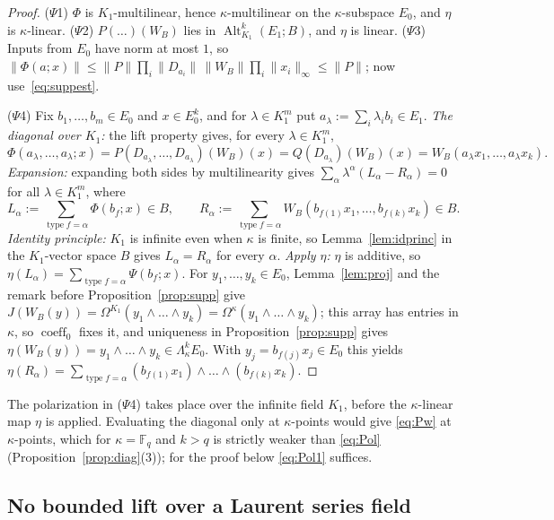 \documentclass[11pt]{amsart}
\theoremstyle{definition}
\theoremstyle{remark}
\numberwithin{equation}{section}
\newcommand{\F}{\mathbb{F}}
\newcommand{\Alt}{\operatorname{Alt}}
\newcommand{\coeff}{\operatorname{coeff}}
\newcommand{\type}{\operatorname{type}}
\newcommand{\norm}[1]{\lVert #1\rVert}
\begin{document}
\begin{proof}
($\Psi$1) $\Phi$ is $K_1$\nobreakdash-multilinear, hence $\kappa$\nobreakdash-multilinear on the $\kappa$\nobreakdash-subspace $E_0$, and $\eta$ is
$\kappa$\nobreakdash-linear. ($\Psi$2) $P(\dots)(W_B)$ lies in $\Alt^k_{K_1}(E_1;B)$, and $\eta$ is linear. ($\Psi$3) Inputs from
$E_0$ have norm at most $1$, so
$\norm{\Phi(a;x)}\le\norm P\prod_i\norm{D_{a_i}}\,\norm{W_B}\prod_i\norm{x_i}_\infty\le\norm P$; now
use~\eqref{eq:suppest}.

($\Psi$4) Fix $b_1,\dots,b_m\in E_0$ and $x\in E_0^k$, and for $\lambda\in K_1^m$ put $a_\lambda:=\sum_i\lambda_ib_i\in
E_1$. \emph{The diagonal over $K_1$:} the lift property gives, for every $\lambda\in K_1^m$,
\[
\Phi(a_\lambda,\dots,a_\lambda;x)=P(D_{a_\lambda},\dots,D_{a_\lambda})(W_B)(x)=Q(D_{a_\lambda})(W_B)(x)
=W_B(a_\lambda x_1,\dots,a_\lambda x_k).
\]
\emph{Expansion:} expanding both sides by multilinearity gives $\sum_\alpha\lambda^\alpha(L_\alpha-R_\alpha)=0$ for all
$\lambda\in K_1^m$, where
\[
L_\alpha:=\sum_{\type f=\alpha}\Phi(b_f;x)\in B,\qquad R_\alpha:=\sum_{\type f=\alpha}W_B(b_{f(1)}x_1,\dots,b_{f(k)}x_k)\in B .
\]
\emph{Identity principle:} $K_1$ is infinite even when $\kappa$ is finite, so Lemma~\ref{lem:idprinc} in the
$K_1$\nobreakdash-vector space $B$ gives $L_\alpha=R_\alpha$ for every $\alpha$. \emph{Apply $\eta$:} $\eta$ is additive, so
$\eta(L_\alpha)=\sum_{\type f=\alpha}\Psi(b_f;x)$. For $y_1,\dots,y_k\in E_0$, Lemma~\ref{lem:proj} and the remark before
Proposition~\ref{prop:supp} give $J(W_B(y))=\Omega^{K_1}(y_1\wedge\dots\wedge y_k)=\Omega^\kappa(y_1\wedge\dots\wedge y_k)$; this array has
entries in $\kappa$, so $\coeff_0$ fixes it, and uniqueness in Proposition~\ref{prop:supp} gives
$\eta(W_B(y))=y_1\wedge\dots\wedge y_k\in\Lambda^k_\kappa E_0$. With $y_j=b_{f(j)}x_j\in E_0$ this yields
$\eta(R_\alpha)=\sum_{\type f=\alpha}(b_{f(1)}x_1)\wedge\dots\wedge(b_{f(k)}x_k)$.
\end{proof}

The polarization in ($\Psi$4) takes place over the infinite field $K_1$, before the $\kappa$\nobreakdash-linear map $\eta$ is
applied. Evaluating the diagonal only at $\kappa$\nobreakdash-points would give \eqref{eq:Pw} at $\kappa$\nobreakdash-points, which for $\kappa=\F_q$ and
$k>q$ is strictly weaker than \eqref{eq:Pol} (Proposition~\ref{prop:diag}(3)); for the proof below \eqref{eq:Pol1} suffices.

\subsection{No bounded lift over a Laurent series field}
\end{document}
